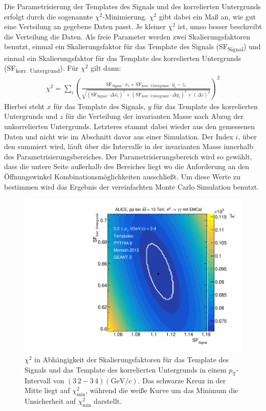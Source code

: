 Die Parametrisierung der Templates des Signals und des korrelierten Untergrunds erfolgt durch die sogenannte $\chi^{2}$-Minimierung.
$\chi^{2}$ gibt dabei ein Maß an, wie gut eine Verteilung an gegebene Daten passt.
Je kleiner $\chi^{2}$ ist, umso besser beschreibt die Verteilung die Daten.
Als freie Parameter werden zwei Skalierungsfaktoren benutzt, einmal ein Skalierungsfaktor für das Template des Signals (SF\textsubscript{Signal}) und einmal ein Skalierungsfaktor für das Template des korrelierten Untergrunds (SF\textsubscript{korr. Untergrund}).
Für $\chi^{2}$ gilt dann:
\begin{align}
\chi^{2} = \sum_{i}\left(\frac{\text{SF}_\text{Signal}\cdot x_{i}+\text{SF}_\text{korr. Untergrund}\cdot y_{i}-z_{i}}{\sqrt{\left(\text{SF}_\text{Signal}\cdot\Delta x_{i}\right)^{2}+\left(\text{SF}_\text{korr. Untergrund}\cdot\Delta y_{i}\right)^{2}+\left(\Delta z\right)^{2}}}\right)^{2}
\label{eq:Chi2}
\end{align}
Hierbei steht $x$ für das Template des Signals, $y$ für das Template des korrelierten Untergrunds und $z$ für die Verteilung der invarianten Masse nach Abzug der unkorrelierten Untergrunds.
Letzteres stammt dabei wieder aus den gemessenen Daten und nicht wie im Abschnitt davor aus einer Simulation.
Der Index $i$, über den summiert wird, läuft über die Intervalle in der invarianten Masse innerhalb des Parametrisierungsbereiches.
Der Parametrisierungsbereich wird so gewählt, dass die untere Seite außerhalb des Bereiches liegt wo die Anforderung an den Öffnungswinkel Kombinationsmöglichkeiten ausschließt.
Um diese Werte zu bestimmen wird das Ergebnis der vereinfachten Monte Carlo Simulation benutzt.
\begin{figure}[t!]
\centering
\includegraphics[width=.65\linewidth]{Chi2Map10_Data_2016.pdf}
\caption{$\chi^{2}$ in Abhängigkeit der Skalierungsfaktoren für das Template des Signals und das Template des korrelierten Untergrunds in einem $p_{\text{T}}$-Intervall von $(3\,2 - 3\,4)(\text{GeV}/c)$.
Das schwarze Kreuz in der Mitte liegt auf $\chi^{2}_\text{min}$, während die weiße Kurve um das Minimum die Unsicherheit auf $\chi^{2}_\text{min}$ darstellt.}
\label{fig:Chi2Map}
\end{figure}

